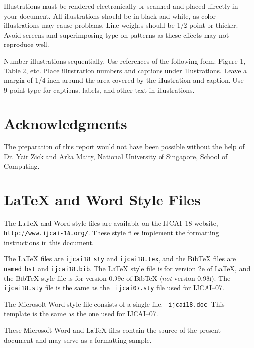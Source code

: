 \documentclass{article}
\begin{document}
Illustrations must be rendered electronically or scanned and placed
directly in your document. All illustrations should be in black and
white, as color illustrations may cause problems. Line weights should
be 1/2-point or thicker. Avoid screens and superimposing type on
patterns as these effects may not reproduce well.

Number illustrations sequentially. Use references of the following
form: Figure 1, Table 2, etc. Place illustration numbers and captions
under illustrations. Leave a margin of 1/4-inch around the area
covered by the illustration and caption.  Use 9-point type for
captions, labels, and other text in illustrations.

\section*{Acknowledgments}

The preparation of this report would not have been possible without the help of Dr. Yair Zick and Arka Maity, National University of Singapore, School of Computing.

\appendix

\section{\LaTeX{} and Word Style Files}\label{stylefiles}

The \LaTeX{} and Word style files are available on the IJCAI--18
website, {\tt http://www.ijcai-18.org/}.
These style files implement the formatting instructions in this
document.

The \LaTeX{} files are {\tt ijcai18.sty} and {\tt ijcai18.tex}, and
the Bib\TeX{} files are {\tt named.bst} and {\tt ijcai18.bib}. The
\LaTeX{} style file is for version 2e of \LaTeX{}, and the Bib\TeX{}
style file is for version 0.99c of Bib\TeX{} ({\em not} version
0.98i). The {\tt ijcai18.sty} file is the same as the {\tt
ijcai07.sty} file used for IJCAI--07.

The Microsoft Word style file consists of a single file, {\tt
ijcai18.doc}. This template is the same as the one used for
IJCAI--07.

These Microsoft Word and \LaTeX{} files contain the source of the
present document and may serve as a formatting sample.  




\end{document}
